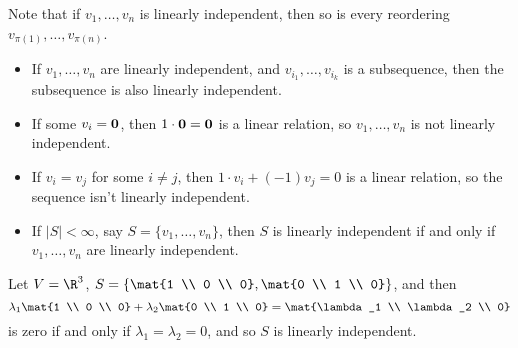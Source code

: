 	\pagebreak

Note that if $v_1,\ldots,v_n$ is linearly independent, then so is every reordering $v_{\pi(1)},\ldots,v_{\pi(n)}$.
\begin{itemize}
	\shortskip
	\item If $v_1,\ldots,v_n$ are linearly independent, and $v_{i_1},\ldots,v_{i_k}$ is a subsequence, then the subsequence is also linearly independent. %
	\item If some $v_i=\bf{0}$, then $1\cdot\bf{0}=\bf{0}$ is a linear relation, so $v_1,\ldots,v_n$ is not linearly independent. %
	\item If $v_i=v_j$ for some $i\neq j$, then $1\cdot v_i + \left( -1 \right)v_j=0$ is a linear relation, so the sequence isn't linearly independent. %
	\item If $\left\vert S \right\vert<\infty$, say $S=\{v_1,\ldots,v_n\}$, then $S$ is linearly independent if and only if $v_1,\ldots,v_n$ are linearly independent. %
\end{itemize}

\begin{example}
	Let $V=\R^3$, $S=\left\{\mat{1 \\ 0 \\ 0}, \mat{0 \\ 1 \\ 0}\right\}$, and then
	\begin{equation*}
		\lambda_1\mat{1 \\ 0 \\ 0} + \lambda_2\mat{0 \\ 1 \\ 0} = \mat{\lambda_1 \\ \lambda_2 \\ 0} %
	\end{equation*}
	is zero if and only if $\lambda_1=\lambda_2=0$, and so $S$ is linearly independent. %
\end{example}

